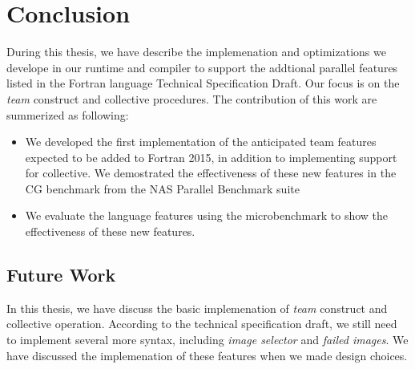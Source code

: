 \chapter{Conclusion}\label{chap:Conclusion}

During this thesis, we have describe the implemenation and optimizations we develope in our runtime and compiler to support the addtional parallel features listed in the Fortran language Technical Specification Draft. Our focus is on the \textit{team} construct and collective procedures. The contribution of this work are summerized as following:
\begin{itemize}
\item We developed the first implementation of the anticipated team features expected to be added to Fortran 2015, in addition to implementing support for collective. We demostrated the effectiveness of these new features in the CG benchmark from the NAS Parallel Benchmark suite
\item We evaluate the language features using the microbenchmark to show the effectiveness of these new features. 
\end{itemize}

\section{Future Work}
In this thesis, we have discuss the basic implemenation of \textit{team} construct and collective operation. According to the technical specification draft, we still need to implement several more syntax, including \textit{image selector} and \textit{failed images}. We have discussed the implemenation of these features when we made design choices. 

